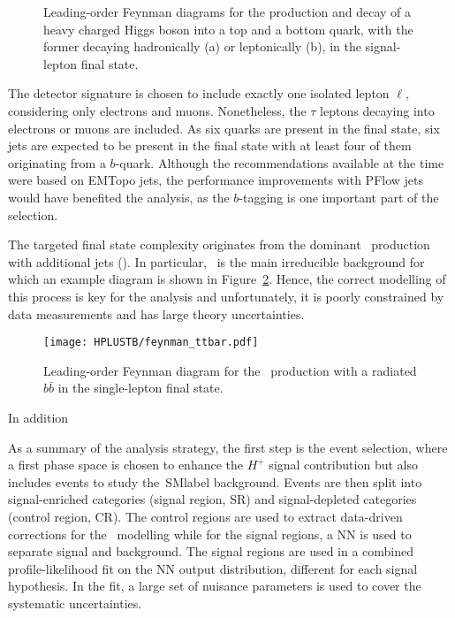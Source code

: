 \begin{figure}[htbp]
    \RawFloats
    \begin{center}
     \quad
    \caption{
        Leading-order Feynman diagrams for the production and decay of a heavy charged Higgs boson into a top and a bottom quark, with the former decaying hadronically (a) or leptonically (b), in the signal-lepton final state.
    }
    \label{Hplustb:feynman2}
    \end{center}
\end{figure}

The detector signature is chosen to include exactly one isolated lepton $\ell$, considering only electrons and muons. Nonetheless, the $\tau$ leptons decaying into electrons or muons are included. As six quarks are present in the final state, six jets are expected to be present in the final state with at least four of them originating from a $b$-quark. Although the recommendations available at the time were based on EMTopo jets, the performance improvements with PFlow jets would have benefited the analysis, as the $b$-tagging is one important part of the selection.

The targeted final state complexity originates from the dominant \ttbar\ production with additional jets (\ttjets). In particular, \ttb\ is the main irreducible background for which an example diagram is shown in Figure~\ref{Hplustb:feynman3}. Hence, the correct modelling of this process is key for the analysis and unfortunately, it is poorly constrained by data measurements and has large theory uncertainties.


\begin{figure}[htbp]
    \RawFloats
    \begin{center}
    \texttt{[image: HPLUSTB/feynman\_ttbar.pdf]}
    \caption{
        Leading-order Feynman diagram for the \ttbar\ production with a radiated $b\bar{b}$ in the single-lepton final state.
    }
    \label{Hplustb:feynman3}
    \end{center}
\end{figure}

In addition

As a summary of the analysis strategy, the first step is the event selection, where a first phase space is chosen to enhance the $H^+$ signal contribution but also includes events to study the~\acrshort{SMlabel} background. Events are then split into signal-enriched categories (signal region, SR) and signal-depleted categories (control region, CR). The control regions are used to extract data-driven corrections for the \ttbar\ modelling while for the signal regions, a NN is used to separate signal and background. The signal regions are used in a combined profile-likelihood fit on the NN output distribution, different for each signal hypothesis. In the fit, a large set of nuisance parameters is used to cover the systematic uncertainties.

